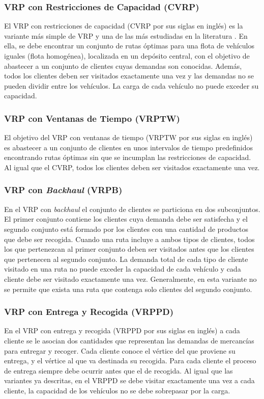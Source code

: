 \subsubsection{VRP con Restricciones de Capacidad (CVRP)}
El VRP con restricciones de capacidad (CVRP por sus siglas en inglés) es la variante más simple de VRP y una de las más estudiadas en la literatura \cite{toth@vrp}. En ella, se debe encontrar un conjunto de rutas óptimas para una flota de vehículos iguales (flota homogénea), localizada en un depósito central, con el objetivo de abastecer a un conjunto de clientes cuyas demandas son conocidas. Además, todos los clientes deben ser visitados exactamente una vez y las demandas no se pueden dividir entre los vehículos. La carga de cada vehículo no puede exceder su capacidad.

\subsubsection{VRP con Ventanas de Tiempo (VRPTW)}
El objetivo del VRP con ventanas de tiempo (VRPTW por sus siglas en inglés) es abastecer a un conjunto de clientes en unos intervalos de tiempo predefinidos encontrando rutas óptimas sin que se incumplan las restricciones de capacidad. Al igual que el CVRP, todos los clientes deben ser visitados exactamente una vez.

\subsubsection{VRP con {\it Backhaul} (VRPB)}
En el VRP con {\it backhaul} el conjunto de clientes se particiona en dos subconjuntos. El primer conjunto contiene los clientes cuya demanda debe ser satisfecha y el segundo conjunto está formado por los clientes con una cantidad de productos que debe ser recogida. Cuando una ruta incluye a ambos tipos de clientes, todos los que pertenezcan al primer conjunto deben ser visitados antes que los clientes que pertenecen al segundo conjunto. La demanda total de cada tipo de cliente visitado en una ruta no puede exceder la capacidad de cada vehículo y cada cliente debe ser visitado exactamente una vez. Generalmente, en esta variante no se permite que exista una ruta que contenga solo clientes del segundo conjunto.

\subsubsection{VRP con Entrega y Recogida (VRPPD)}
En el VRP con entrega y recogida (VRPPD por sus siglas en inglés) a cada cliente se le asocian dos cantidades que representan las demandas de mercancías para entregar y recoger. Cada cliente conoce el vértice del que proviene su entrega, y el vértice al que va destinada su recogida. Para cada cliente el proceso de entrega siempre debe ocurrir antes que el de recogida. Al igual que las variantes ya descritas, en el VRPPD  se debe visitar exactamente una vez a cada cliente, la capacidad de los vehículos no se debe sobrepasar por la carga.

